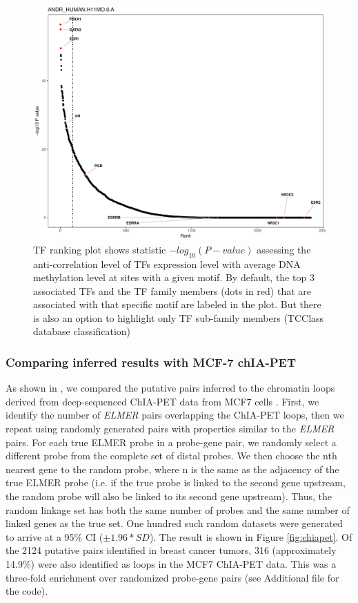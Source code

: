 \begin{figure}
\centering
\includegraphics[width=1.0\textwidth]{images/ANDR_HUMAN_H11MO_0_A_TFrankPlot.pdf}
\caption[TF ranking plot: ANDR motif]{\label{fig:tfplot} TF ranking plot shows statistic $-log_{10}(P-value)$ assessing the anti-correlation level
of TFs expression level with average DNA methylation level at sites with a given motif. By default, the top 3 associated TFs and the TF family members (dots in red) that are associated with that specific motif  are labeled in the plot.
But there is also an option to highlight only TF sub-family members (TCClass database classification)}
\end{figure}



\subsubsection*{Comparing inferred results with MCF-7 chIA-PET}

As shown in , we compared the putative pairs inferred to the chromatin loops derived from deep-sequenced ChIA-PET data from MCF7 cells \cite{li2012extensive}. First, we identify the number of \textit{ELMER} pairs overlapping the ChIA-PET loops, then we repeat using randomly generated  pairs with properties similar to the \textit{ELMER} pairs. For each true ELMER probe in a probe-gene pair, we randomly select a different probe from the complete set of distal probes. We then choose the nth nearest gene to the random probe, where n is the same as the adjacency of the true ELMER probe (i.e. if the true probe is linked to the second gene upstream, the  random probe will also be linked to its second gene upstream). Thus, the random linkage set has both the same number of probes and the same number of linked genes as the true set. One hundred such random datasets were generated to arrive at a 95\% CI ($\pm 1.96* SD$).
The result is shown in Figure \ref{fig:chiapet}. Of the 2124 putative pairs identified in breast cancer tumors, 316 (approximately 14.9\%) were also identified as loops in the MCF7 ChIA-PET data. This was a three-fold enrichment over randomized probe-gene pairs (see Additional file for the code).


